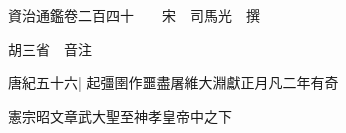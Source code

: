 






























































資治通鑑卷二百四十　　宋　司馬光　撰

胡三省　音注

唐紀五十六|{
	起彊圉作噩盡屠維大淵獻正月凡二年有奇}


憲宗昭文章武大聖至神孝皇帝中之下

